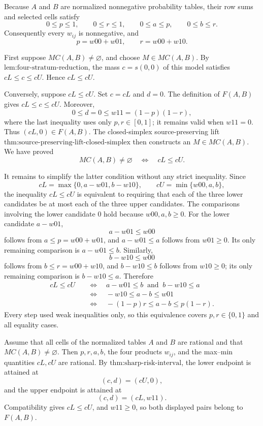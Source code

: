 Because \(A\) and \(B\) are normalized nonnegative probability tables, their row sums and selected cells satisfy
\[
0\le p\le1,\qquad 0\le r\le1,\qquad 0\le a\le p,\qquad 0\le b\le r.
\]
Consequently every \(w_{ij}\) is nonnegative, and
\[
p=w00+w01,\qquad r=w00+w10.
\]

First suppose \(MC(A,B)\ne\varnothing\), and choose \(M\in MC(A,B)\).  By \(\text{lem:four-stratum-reduction}\), the mass \(c=s(0,0)\) of this model satisfies \(cL\le c\le cU\).  Hence \(cL\le cU\).

Conversely, suppose \(cL\le cU\).  Set \(c=cL\) and \(d=0\).  The definition of \(F(A,B)\) gives \(cL\le c\le cU\).  Moreover,
\[
0\le d=0\le w11=(1-p)(1-r),
\]
where the last inequality uses only \(p,r\in[0,1]\); it remains valid when \(w11=0\).  Thus \((cL,0)\in F(A,B)\).  The closed-simplex source-preserving lift \(\text{thm:source-preserving-lift-closed-simplex}\) then constructs an \(M\in MC(A,B)\).  We have proved
\[
MC(A,B)\ne\varnothing\quad\Longleftrightarrow\quad cL\le cU.
\]

It remains to simplify the latter condition without any strict inequality.  Since
\[
cL=\max\{0,a-w01,b-w10\},\qquad cU=\min\{w00,a,b\},
\]
the inequality \(cL\le cU\) is equivalent to requiring that each of the three lower candidates be at most each of the three upper candidates.  The comparisons involving the lower candidate \(0\) hold because \(w00,a,b\ge0\).  For the lower candidate \(a-w01\),
\[
a-w01\le w00
\]
follows from \(a\le p=w00+w01\), and \(a-w01\le a\) follows from \(w01\ge0\).  Its only remaining comparison is \(a-w01\le b\).  Similarly,
\[
b-w10\le w00
\]
follows from \(b\le r=w00+w10\), and \(b-w10\le b\) follows from \(w10\ge0\); its only remaining comparison is \(b-w10\le a\).  Therefore
\[
\begin{aligned}
cL\le cU
&\quad\Longleftrightarrow\quad a-w01\le b\ \text{ and }\ b-w10\le a\\
&\quad\Longleftrightarrow\quad -w10\le a-b\le w01\\
&\quad\Longleftrightarrow\quad -(1-p)r\le a-b\le p(1-r).
\end{aligned}
\]
Every step used weak inequalities only, so this equivalence covers \(p,r\in\{0,1\}\) and all equality cases.

Assume that all cells of the normalized tables \(A\) and \(B\) are rational and that \(MC(A,B)\ne\varnothing\).  Then \(p,r,a,b\), the four products \(w_{ij}\), and the max--min quantities \(cL,cU\) are rational.  By \(\text{thm:sharp-risk-interval}\), the lower endpoint is attained at
\[
(c,d)=(cU,0),
\]
and the upper endpoint is attained at
\[
(c,d)=(cL,w11).
\]
Compatibility gives \(cL\le cU\), and \(w11\ge0\), so both displayed pairs belong to \(F(A,B)\).

